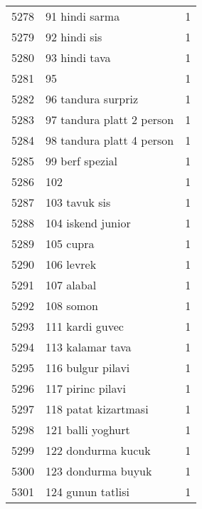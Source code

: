 \begin{tabular}{llr}
5278 &                                     91 hindi sarma &      1 \\
5279 &                                       92 hindi sis &      1 \\
5280 &                                      93 hindi tava &      1 \\
5281 &                                                 95 &      1 \\
5282 &                                 96 tandura surpriz &      1 \\
5283 &                          97 tandura platt 2 person &      1 \\
5284 &                          98 tandura platt 4 person &      1 \\
5285 &                                    99 berf spezial &      1 \\
5286 &                                                102 &      1 \\
5287 &                                      103 tavuk sis &      1 \\
5288 &                                  104 iskend junior &      1 \\
5289 &                                          105 cupra &      1 \\
5290 &                                         106 levrek &      1 \\
5291 &                                         107 alabal &      1 \\
5292 &                                          108 somon &      1 \\
5293 &                                    111 kardi guvec &      1 \\
5294 &                                   113 kalamar tava &      1 \\
5295 &                                  116 bulgur pilavi &      1 \\
5296 &                                  117 pirinc pilavi &      1 \\
5297 &                               118 patat kizartmasi &      1 \\
5298 &                                  121 balli yoghurt &      1 \\
5299 &                                 122 dondurma kucuk &      1 \\
5300 &                                 123 dondurma buyuk &      1 \\
5301 &                                  124 gunun tatlisi &      1 \\

\end{tabular}
